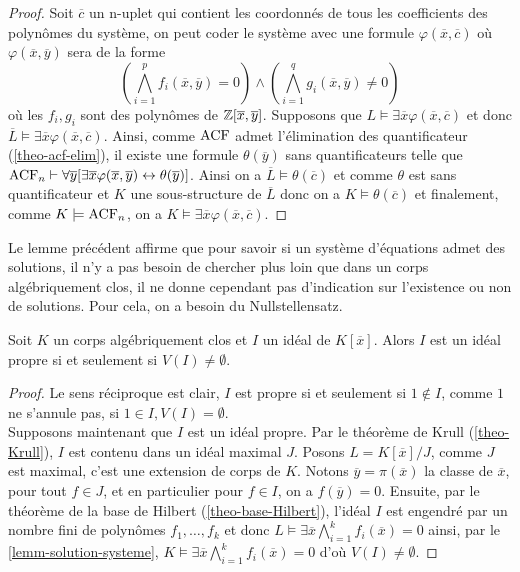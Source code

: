 \begin{proof}
Soit $\overline{c}$ un n-uplet qui contient les coordonnés de tous les
coefficients des polynômes du système, on peut coder le système avec une formule
$\varphi(\overline{x},\overline{c})$ où $\varphi(\overline{x},\overline{y})$ sera
de la forme \[  (\bigwedge_{i=1}^{p} f_i(\overline{x},\overline{y})  =0 ) \wedge
(\bigwedge_{i=1}^{q} g_i(\overline{x},\overline{y})  \neq 0 )  \] où les
$f_i,g_i$ sont des polynômes de $\mathbb{Z}[\overline{x},\overline{y}]$. Supposons que
$L \models \exists \overline{x} \varphi(\overline{x},\overline{c})$ et donc $\overline{L} \models
\exists \overline{x} \varphi(\overline{x},\overline{c})$. Ainsi, comme $\operatorname{ACF}$
admet l'élimination des quantificateur (\cref{theo-acf-elim}), il existe une
formule $\theta(\overline{y})$ sans quantificateurs telle que $\operatorname{ACF}_n \vdash
\forall \overline{y} [\exists \overline{x} \varphi(\overline{x},\overline{y})
\leftrightarrow \theta(\overline{y}) ]$. Ainsi on a $\overline{L} \models
\theta(\overline{c})$ et comme $\theta$ est sans quantificateur et $K$ une
sous-structure de $\overline{L}$ donc
on a $K \models \theta(\overline{c})$ et finalement, comme $K \models \operatorname{ACF}_n$,
on a $K \models \exists \overline{x} \varphi(\overline{x},\overline{c})$.
\end{proof} 

Le lemme précédent affirme que pour savoir si un système d'équations admet
des solutions, il n'y a pas besoin de chercher plus loin que dans un corps
algébriquement clos, il ne donne cependant pas d'indication sur l'existence ou
non de solutions. Pour cela, on a besoin du Nullstellensatz.

\begin{theo}\label{theo-Nullstellensatz-faible}
Soit $K$ un corps algébriquement clos et $I$ un idéal de $K[\overline{x}]$.
Alors $I$ est un idéal propre si et seulement si $V(I) \neq \emptyset$.
\end{theo}

\begin{proof}
Le sens réciproque est clair, $I$ est propre si et seulement si $1 \not\in I$,
comme $1$ ne s'annule pas, si $1 \in I, V(I) = \emptyset$. \\
Supposons maintenant que $I$ est un idéal propre. Par le théorème de Krull
(\cref{theo-Krull}), $I$ est contenu dans un idéal maximal $J$. Posons $L =
K[\overline{x}]/J$, comme $J$ est maximal, c'est une extension de corps de $K$.
Notons $\overline{y} = \pi(\overline{x})$ la classe de $\overline{x}$, pour tout
$f\in J$, et en particulier pour $f \in I$, on a $f(\overline{y}) = 0$.
Ensuite, par le théorème de la base de Hilbert (\cref{theo-base-Hilbert}),
l'idéal $I$ est engendré par un nombre fini de polynômes $f_1, \ldots, f_k$ et
donc $L \models \exists \overline{x} \bigwedge_{i=1}^{k} f_i(\overline{x}) = 0$
ainsi, par le \cref{lemm-solution-systeme}, $K \models \exists \overline{x}
\bigwedge_{i=1}^{k} f_i(\overline{x}) = 0$ d'où $V(I) \neq \emptyset$.
\end{proof}



